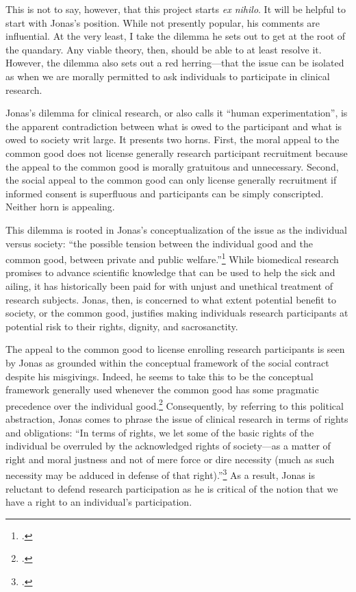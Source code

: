 \documentclass[letterpaper,notitlepage,12pt]{article}
\begin{document}
This is not to say, however, that this project starts \textit{ex nihilo}.
It will be helpful to start with Jonas's position.
While not presently popular, his comments are influential.
At the very least, I take the dilemma he sets out to get at the root of the
quandary.
Any viable theory, then, should be able to at least resolve it.
However, the dilemma also sets out a red herring---that the issue can be
isolated as when we are morally permitted to ask individuals to participate in
clinical research.

Jonas's dilemma for clinical research, or also calls it ``human
experimentation'', is the apparent contradiction between what is owed to the
participant and what is owed to society writ large.
It presents two horns.
First, the moral appeal to the common good does not license generally research
participant recruitment because the appeal to the common good is morally
gratuitous and unnecessary.
Second, the social appeal to the common good can only license generally
recruitment if informed consent is superfluous and participants can be simply
conscripted.
Neither horn is appealing.

This dilemma is rooted in Jonas's conceptualization of the issue as the
individual versus society: ``the possible tension between the individual good
and the common good, between private and public
welfare.''\footcite[p. 221--2]{jonas_philosophical_1969}
While biomedical research promises to advance scientific knowledge that can be
used to help the sick and ailing, it has historically been paid for with unjust
and unethical treatment of research subjects.
Jonas, then, is concerned to what extent potential benefit to society, or the
common good, justifies making individuals research participants at potential
risk to their rights, dignity, and sacrosanctity.

The appeal to the common good to license enrolling research participants is seen
by Jonas as grounded within the conceptual framework of the social contract
despite his misgivings.
Indeed, he seems to take this to be the conceptual framework generally used
whenever the common good has some pragmatic precedence over the individual
good.\footcite[p. 221]{jonas_philosophical_1969}
Consequently, by referring to this political abstraction, Jonas comes to phrase
the issue of clinical research in terms of rights and obligations: ``In terms
of rights, we let some of the basic rights of the individual be overruled by
the acknowledged rights of society---as a matter of right and moral justness
and not of mere force or dire necessity (much as such necessity may be adduced
in defense of that right).''\footcite[p. 221]{jonas_philosophical_1969}
As a result, Jonas is reluctant to defend research participation as he is
critical of the notion that we have a right to an individual's participation.
\end{document}
